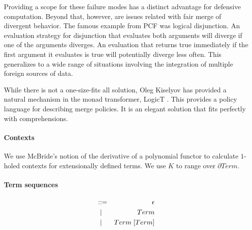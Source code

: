 Providing a scope for these failure modes has a distinct advantage for defensive computation. Beyond that, however, are issues related with fair merge of divergent behavior. The famous example from PCF was logical disjunction. An evaluation strategy for disjunction that evaluates both arguments will diverge if one of the arguments diverges. An evaluation that returns true immediately if the first argument it evaluates is true will potentially diverge less often. This generalizes to a wide range of situations involving the integration of multiple foreign sources of data. 

While there is not a one-size-fits all solution, Oleg Kiselyov has provided a natural mechanism in the monad transformer, LogicT \cite{DBLP:conf/icfp/KiselyovSFS05}. This provides a policy language for describing merge policies. It is an elegant solution that fits perfectly with comprehensions.

\paragraph{Contexts}
We use McBride's notion of the derivative of a polynomial functor to calculate $1$-holed contexts for extensionally defined terms. We use $K$ to range over $\partial Term$.

\paragraph{Term sequences}
\begin{eqnarray*}
  [Term] & \bc & \epsilon \\
  & \;\bm \; & Term \\
  & \;\bm \; & Term \; [Term]
\end{eqnarray*}

